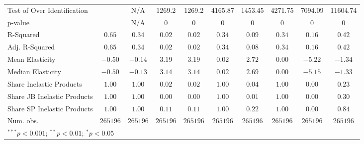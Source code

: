 \documentclass{article}
\begin{document}
\begin{appendices}
\begin{table}
{\begin{tabular}{l c c c c c c c c c}
Test of Over Identification &               & N/A           & 1269.2        & 1269.2        & 4165.87       & 1453.45       & 4271.75       & 7094.09       & 11604.74      \\
p-value                     &               & N/A           & 0             & 0             & 0             & 0             & 0             & 0             & 0             \\
R-Squared                   & $0.65$        & $0.34$        & $0.02$        & $0.02$        & $0.34$        & $0.09$        & $0.34$        & $0.16$        & $0.42$        \\
Adj. R-Squared              & $0.65$        & $0.34$        & $0.02$        & $0.02$        & $0.34$        & $0.08$        & $0.34$        & $0.16$        & $0.42$        \\
Mean Elasticity             & $-0.50$       & $-0.14$       & $3.19$        & $3.19$        & $0.02$        & $2.72$        & $0.00$        & $-5.22$       & $-1.34$       \\
Median Elasticity           & $-0.50$       & $-0.13$       & $3.14$        & $3.14$        & $0.02$        & $2.69$        & $0.00$        & $-5.15$       & $-1.33$       \\
Share Inelastic Products    & $1.00$        & $1.00$        & $0.02$        & $0.02$        & $1.00$        & $0.04$        & $1.00$        & $0.00$        & $0.23$        \\
Share JB Inelastic Products & $1.00$        & $1.00$        & $0.00$        & $0.00$        & $1.00$        & $0.01$        & $1.00$        & $0.00$        & $0.30$        \\
Share SP Inelastic Products & $1.00$        & $1.00$        & $0.11$        & $0.11$        & $1.00$        & $0.22$        & $1.00$        & $0.00$        & $0.84$        \\
Num. obs.                   & $265196$      & $265196$      & $265196$      & $265196$      & $265196$      & $265196$      & $265196$      & $265196$      & $265196$      \\
\bottomrule
\multicolumn{10}{l}{\scriptsize{$^{***}p<0.001$; $^{**}p<0.01$; $^{*}p<0.05$}}
\end{tabular}
    }
\end{table}


\end{appendices}
\end{document}

